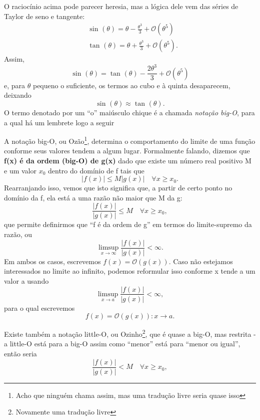 \documentclass[../pde_notes.tex]{subfiles}
\begin{document}
\begin{tcolorbox}[
		skin=enhanced,
		title=Lembrete!,
		after title={\hfill Aproximando Funções Trigonométricas},
		fonttitle=\bfseries,
		sharp corners=downhill,
		colframe=black,
		colbacktitle=yellow!75!white,
		colback=yellow!30,
		colbacklower=black,
		coltitle=black,
		drop large lifted shadow
	]
	O raciocínio acima pode parecer heresia, mas a lógica dele vem das séries de Taylor de seno e tangente:
	\begin{align*}
		 & \sin^{}{(\theta )} = \theta - \frac{\theta^{3}}{3} + \mathcal{O}(\theta^{5})  \\
		 & \tan^{}{(\theta )} = \theta + \frac{\theta^{3}}{3} + \mathcal{O}(\theta^{5}).
	\end{align*}
	Assim,
	\[
		\sin^{}{(\theta )} = \tan^{}{(\theta )} - \frac{2\theta^{3}}{3} + \mathcal{O}(\theta^{5})
	\]
	e, para \(\theta \) pequeno o suficiente, os termos ao cubo e à quinta desaparecem, deixando
	\[
		\sin^{}{(\theta )}\approx \tan^{}{(\theta )}.
	\]
	O termo denotado por um ``o'' maiúsculo chique é a chamada \textit{notação big-O}, para a qual há um lembrete logo a seguir
\end{tcolorbox}
\begin{tcolorbox}[
		skin=enhanced,
		title=Lembrete!,
		after title={\hfill Notação big-O e little-O},
		fonttitle=\bfseries,
		sharp corners=downhill,
		colframe=black,
		colbacktitle=yellow!75!white,
		colback=yellow!30,
		colbacklower=black,
		coltitle=black,
		drop large lifted shadow
	]
	A notação big-O, ou Ozão\footnote{Acho que ninguém chama assim, mas uma tradução livre seria quase isso}, determina o comportamento do limite de uma função conforme seus valores tendem a algum lugar. Formalmente falando, dizemos que \textbf{f(x) é da ordem (big-O) de g(x)} dado que existe um número real positivo M e um valor \(x_{0}\) dentro do domínio de f tais que
	\[
		|f(x)|\leq M|g(x)| \quad \forall x\geq x_{0}.
	\]
	Rearranjando isso, vemos que isto significa que, a partir de certo ponto no domínio da f, ela está a uma razão não maior que M da g:
	\[
		\frac{|f(x)|}{|g(x)|} \leq M \quad \forall x\geq x_{0},
	\]
	que permite definirmos que ``f é da ordem de g'' em termos do limite-supremo da razão, ou
	\[
		\limsup_{x\to \infty}\frac{|f(x)|}{|g(x)|} < \infty.
	\]
	Em ambos os casos, escrevemos \(f(x) = \mathcal{O}(g(x))\). Caso não estejamos interessados no limite ao infinito, podemos reformular isso conforme x tende a um valor a usando
	\[
		\limsup_{x\to a} \frac{|f(x)|}{|g(x)|} < \infty,
	\]
	para o qual escrevemos
	\[
		f(x) = \mathcal{O}(g(x)): x\rightarrow a.
	\]

	Existe também a notação little-O, ou Ozinho\footnote{Novamente uma tradução livre}, que é quase a big-O, mas restrita - a little-O está para a big-O assim como ``menor'' está para ``menor ou igual'', então seria
	\[
		\frac{|f(x)|}{|g(x)|} < M \quad \forall x\geq x_{0},
	\]
\end{tcolorbox}
\end{document}
